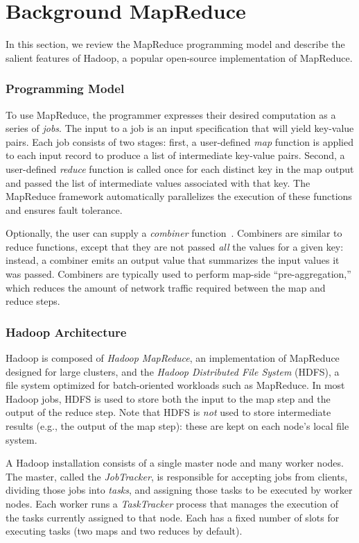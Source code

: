 \chapter[Background MapReduce]{Background MapReduce}
\label{ch:background}

In this section, we review the MapReduce programming model and describe the
salient features of Hadoop, a popular open-source implementation of MapReduce.

\subsection{Programming Model}
\label{sec:progmodel}
To use MapReduce, the programmer expresses their desired computation as a series
of \emph{jobs}. The input to a job is an input specification that will yield
key-value pairs. Each job consists of two stages: first, a user-defined
\emph{map} function is applied to each input record to produce a list of
intermediate key-value pairs. Second, a user-defined \emph{reduce} function is
called once for each distinct key in the map output and passed the list of
intermediate values associated with that key.  The MapReduce framework
automatically parallelizes the execution of these functions and ensures fault
tolerance.

Optionally, the user can supply a \emph{combiner}
function~\cite{mapreduce-osdi}. Combiners are similar to reduce functions,
except that they are not passed \emph{all} the values for a given key: instead,
a combiner emits an output value that summarizes the input values it was
passed. Combiners are typically used to perform map-side ``pre-aggregation,''
which reduces the amount of network traffic required between the map and reduce
steps.

\subsection{Hadoop Architecture}
Hadoop is composed of \emph{Hadoop MapReduce}, an implementation of
MapReduce designed for large clusters, and the \emph{Hadoop
  Distributed File System} (HDFS), a file system optimized for
batch-oriented workloads such as MapReduce. In most Hadoop jobs, HDFS
is used to store both the input to the map step and the output of the
reduce step. Note that HDFS is \emph{not} used to store intermediate
results (e.g., the output of the map step): these are kept on each
node's local file system.

A Hadoop installation consists of a single master node and many worker
nodes. The master, called the \emph{JobTracker}, is responsible for
accepting jobs from clients, dividing those jobs into \emph{tasks},
and assigning those tasks to be executed by worker nodes. Each worker
runs a \emph{TaskTracker} process that manages the execution of the
tasks currently assigned to that node. Each {\TT} has a fixed number
of slots for executing tasks (two maps and two reduces by
default).%

